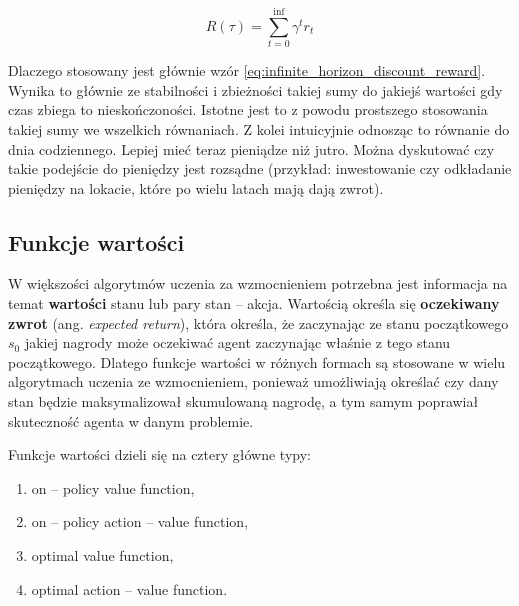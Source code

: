 \begin{equation}
	R(\tau)=\sum_{t=0}^{\inf} \gamma^tr_t
	\label{eq:infinite_horizon_discount_reward}
\end{equation}	

Dlaczego stosowany jest głównie wzór \ref{eq:infinite_horizon_discount_reward}. 
Wynika to głównie ze stabilności i zbieżności takiej sumy do jakiejś wartości 
gdy czas zbiega to nieskończoności. Istotne jest to z powodu prostszego 
stosowania takiej sumy we wszelkich równaniach. Z kolei intuicyjnie odnosząc to 
równanie do dnia codziennego. Lepiej mieć teraz pieniądze niż jutro. Można 
dyskutować czy takie podejście do pieniędzy jest rozsądne (przykład: 
inwestowanie czy odkładanie pieniędzy na lokacie, które po wielu latach mają 
dają zwrot).

\subsection{Funkcje wartości}

W większości algorytmów uczenia za wzmocnieniem potrzebna jest informacja na 
temat \textbf{wartości} stanu lub pary stan -- akcja. Wartością określa się 
\textbf{oczekiwany zwrot} (ang. \textit{expected return}), która określa, że 
zaczynając ze stanu początkowego $s_0$ jakiej nagrody może oczekiwać agent 
zaczynając właśnie z tego stanu początkowego. Dlatego funkcje wartości w 
różnych formach są stosowane w wielu algorytmach uczenia ze wzmocnieniem, 
ponieważ umożliwiają określać czy dany stan będzie maksymalizował skumulowaną 
nagrodę, a tym samym poprawiał skuteczność agenta w danym problemie.

Funkcje wartości dzieli się na cztery główne typy:

\begin{enumerate}
	\item on -- policy value function,
	\item on -- policy action -- value function,
	\item optimal value function,
	\item optimal action -- value function. 
\end{enumerate}



